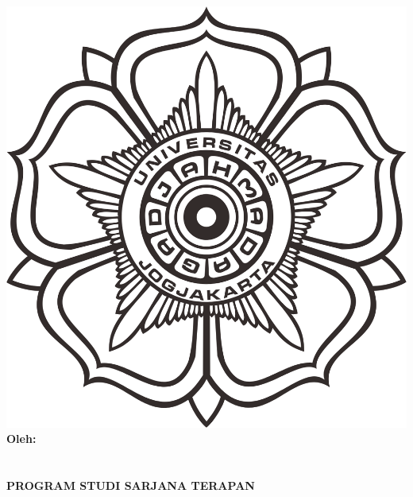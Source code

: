 \begin{titlepage}
    \begin{center}
        \begin{doublespace}
            \textbf{\MakeUppercase{\large{\tipe}}}\\[0.5cm]
            \textbf{\MakeUppercase{\normalsize{\judulid}}}\\
            \textbf{\MakeUppercase{\normalsize{\tempat}}}\\[2.5cm]
            
        \end{doublespace}
        \includegraphics[width=0.35\linewidth]{gambar/logo-ugm.png}\\[1cm]

        \textbf{\normalsize {Oleh:}} \\
        \textbf{\normalsize \MakeUppercase{\underline{\penulis}}} \\
        \textbf{\normalsize \MakeUppercase{{\nim}}} \\[4cm]


        \textbf{\normalsize \MakeUppercase{Program Studi Sarjana Terapan \\ \prodi}}\\
        \textbf{\normalsize \MakeUppercase{\departemen}}\\
        \textbf{\normalsize \MakeUppercase{\fakultas}}\\
        \textbf{\normalsize \MakeUppercase{\universitas}}\\
        \textbf{\normalsize \the\year{}}\\
    \end{center}
\end{titlepage}